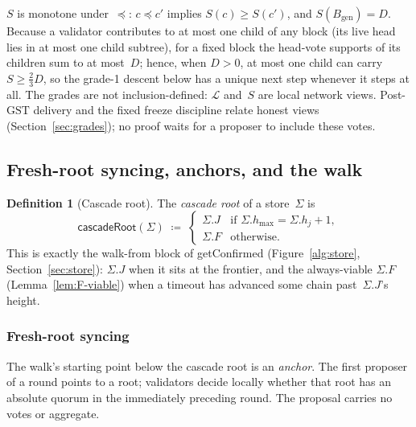 \ifx\litemode\undefined\documentclass{article}\fi
\newcommand{\genesis}{\ensuremath{B_{\mathrm{gen}}}}
\newcommand{\hmax}{\ensuremath{h_{\max}}\xspace}
\newcommand{\GST}{\ensuremath{\mathrm{GST}}\xspace}
\newcommand{\getConfirmed}{\textsf{getConfirmed}\xspace}
\newcommand{\Supp}{\ensuremath{S}}          %
\newcommand{\Dvote}{\ensuremath{D}}         %
\newcommand{\cascadeRoot}{\textsf{cascadeRoot}\xspace}
\theoremstyle{plain}
\theoremstyle{definition}
\newtheorem{definition}{Definition}
\theoremstyle{remark}
\begin{document}
$\Supp$ is monotone under~$\preceq$: $c \preceq c'$ implies
$\Supp(c) \geq \Supp(c')$, and $\Supp(\genesis) = \Dvote$.  Because a validator
contributes to at most one child of any block (its live head lies in at
most one child subtree), for a fixed block the head-vote supports of its
children sum to at most~$\Dvote$; hence, when $\Dvote>0$, at most one child can carry
$\Supp \geq \tfrac23\Dvote$, so the grade-1 descent below has a unique next
step whenever it steps at all.
The grades are not inclusion-defined: $\mathcal{L}$ and~$\Supp$ are local
network views.  Post-\GST{} delivery and the fixed freeze discipline
relate honest views (Section~\ref{sec:grades}); no proof waits for a proposer
to include these votes.

\subsection{Fresh-root syncing, anchors, and the walk}\label{sec:walk}

\begin{definition}[Cascade root]\label{def:cascade-root}
The \emph{cascade root} of a store~$\Sigma$ is
\[
  \cascadeRoot(\Sigma) \;\coloneqq\;
  \begin{cases}
    \Sigma.J & \text{if } \Sigma.\hmax = \Sigma.h_j + 1,\\
    \Sigma.F & \text{otherwise.}
  \end{cases}
\]
This is exactly the walk-from block of \getConfirmed
(Figure~\ref{alg:store}, Section~\ref{sec:store}): $\Sigma.J$ when it sits
at the frontier, and the always-viable $\Sigma.F$ (Lemma~\ref{lem:F-viable})
when a timeout has advanced some chain past~$\Sigma.J$'s height.
\end{definition}

\subsubsection*{Fresh-root syncing}

The walk's starting point below the cascade root is an \emph{anchor}.  The
first proposer of a round points to a root; validators decide locally whether
that root has an absolute quorum in the immediately preceding round.  The
proposal carries no votes or aggregate.
\end{document}
